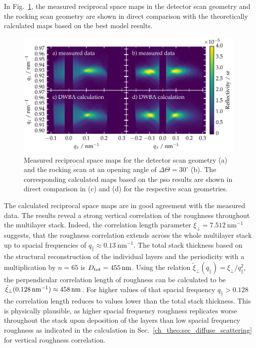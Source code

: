 In Fig.~\ref{ch_diff:fig_PTB17_diffuse_comparisonWithTheory}, the measured reciprocal space maps in the detector scan geometry and the rocking scan geometry are shown in direct comparison with the theoretically calculated maps based on the best model results. 
\begin{figure}[htbp]
        \includegraphics[width=
        \textwidth]{img/PTB17_diffuse_simulation_vs_measurement} \caption{Measured  reciprocal space maps for the detector scan geometry (a) and the rocking scan at an opening angle of $\Delta\Theta=30^\circ$ (b). The corresponding calculated maps based on the \gls{pso} results are shown in direct comparison in (c) and (d) for the respective scan geometries.} \label{ch_diff:fig_PTB17_diffuse_comparisonWithTheory} 
\end{figure}

The calculated reciprocal space maps are in good agreement with the measured data. The results reveal a strong vertical correlation of the roughness throughout the multilayer stack. Indeed, the correlation length parameter $\xi_\perp = \SI{7.512}{\nano\meter^{-1}}$ suggests, that the roughness correlation extends across the whole multilayer stack up to spacial frequencies of $q_\parallel \approx \SI{0.13}{\nano\meter^{-1}}$. The total stack thickness based on the structural reconstruction of the individual layers and the periodicity with a multiplication by $n=65$ is $D_\text{tot} = \nm{455}$. Using the relation $\tilde{\xi}_\perp(q_\parallel) = \xi_\perp / q_\parallel^2$, the perpendicular correlation length of roughness can be calculated to be $\tilde{\xi}_\perp(\SI{0.128}{\nano\meter^{-1}}) \approx \nm{458}$. For higher values of that spacial frequency $q_\parallel > 0.128$ the correlation length reduces to values lower than the total stack thickness. This is physically plausible, as higher spacial frequency roughness replicates worse throughout the stack upon deposition of the layers than low spacial frequency roughness as indicated in the calculation in Sec.~\ref{ch_theo:sec_diffuse_scattering} for vertical roughness correlation.

